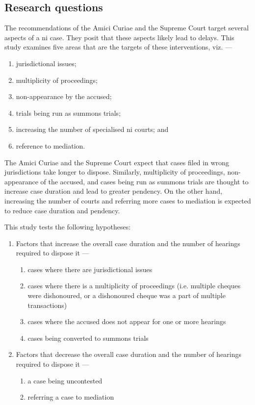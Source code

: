 \subsection{Research questions} \label{sec:research-questions}

The recommendations of the Amici Curiae and the Supreme Court target several aspects of a \gls{ni} case. They posit that these aspects likely lead to delays. This study examines five areas that are the targets of these interventions, viz. ---

\begin{enumerate}
\item jurisdictional issues;
\item multiplicity of proceedings;
\item non-appearance by the accused;
\item trials being run as summons trials;
\item increasing the number of specialised \gls{ni} courts; and
\item reference to mediation.
\end{enumerate}

The Amici Curiae and the Supreme Court expect that cases filed in wrong jurisdictions take longer to dispose. Similarly, multiplicity of proceedings, non-appearance of the accused, and cases being run as summons trials are thought to increase case duration and lead to greater pendency. On the other hand, increasing the number of courts and referring more cases to mediation is expected to reduce case duration and pendency. 

This study tests the following hypotheses:

\begin{enumerate}
\item Factors that increase the overall case duration and the number of hearings required to dispose it ---
 \begin{enumerate}
 \item cases where there are jurisdictional issues
 \item cases where there is a multiplicity of proceedings (i.e. multiple cheques were dishonoured, or a dishonoured cheque was a part of multiple transactions)
 \item cases where the accused does not appear for one or more hearings
 \item cases being converted to summons trials
 \end{enumerate}
\item Factors that decrease the overall case duration and the number of hearings required to dispose it ---
 \begin{enumerate}
 \item a case being uncontested
 \item referring a case to mediation
 \end{enumerate}
\end{enumerate}

